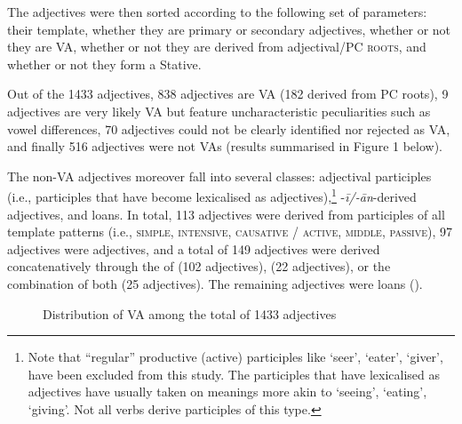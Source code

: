\documentclass[output=paper,colorlinks,citecolor=brown]{langscibook}
\begin{document}
The adjectives were then sorted according to the following set of parameters: their template, whether they are primary or secondary adjectives, whether or not they are VA, whether or not they are derived from adjectival/PC \textsc{roots}, and whether or not they form a Stative.

Out of the 1433 adjectives, 838 adjectives are VA (182 derived from PC roots), 9 adjectives are very likely VA but feature uncharacteristic peculiarities such as vowel differences, 70 adjectives could not be clearly identified nor rejected as VA, and finally 516 adjectives were not VAs (results summarised in Figure 1 below).

The non-VA adjectives moreover fall into several classes: adjectival participles (i.e., participles that have become lexicalised as adjectives),\footnote{Note
    that “regular” productive (active) participles like `seer', `eater', `giver', have been excluded from this study. The participles that have lexicalised as adjectives have usually taken on meanings more akin to `seeing', `eating', `giving'. Not all verbs derive participles of this type.
} -\textit{ī/-\textit{ān}}-derived   adjectives, and loans. In total, 113 adjectives were derived from participles of all template patterns (i.e., \textsc{simple}, \textsc{intensive}, \textsc{causative} / \textsc{active, middle, passive}), 97 adjectives were  adjectives, and a total of 149 adjectives were derived concatenatively through the  of  (102 adjectives),  (22 adjectives), or the combination of both (25 adjectives). The remaining adjectives were loans ().

\begin{figure}
\caption{Distribution of VA among the total of 1433 adjectives}
\label{fig:kamil:1}
\end{figure}
\end{document}
